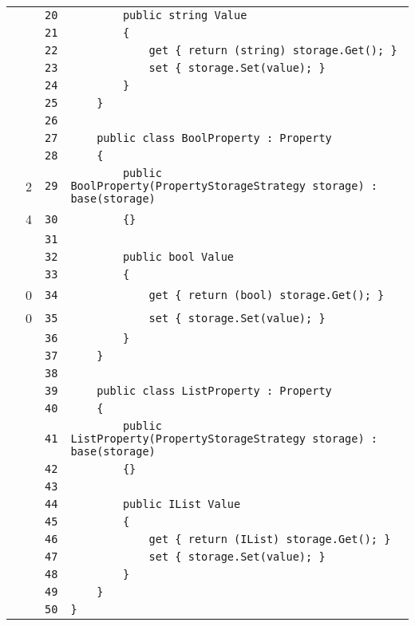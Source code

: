 \documentclass[a4paper,10pt]{article}
\begin{document}
\begin{longtable}[l]{lrrl}
\cellcolor{gray} &  & \verb~20~ & \verb~        public string Value~\\
\cellcolor{gray} &  & \verb~21~ & \verb~        {~\\
\cellcolor{gray} &  & \verb~22~ & \verb~            get { return (string) storage.Get(); }~\\
\cellcolor{gray} &  & \verb~23~ & \verb~            set { storage.Set(value); }~\\
\cellcolor{gray} &  & \verb~24~ & \verb~        }~\\
\cellcolor{gray} &  & \verb~25~ & \verb~    }~\\
\cellcolor{gray} &  & \verb~26~ & \verb~~\\
\cellcolor{gray} &  & \verb~27~ & \verb~    public class BoolProperty : Property~\\
\cellcolor{gray} &  & \verb~28~ & \verb~    {~\\
\cellcolor{green} & 2 & \verb~29~ & \verb~        public BoolProperty(PropertyStorageStrategy storage) : base(storage)~\\
\cellcolor{green} & 4 & \verb~30~ & \verb~        {}~\\
\cellcolor{gray} &  & \verb~31~ & \verb~~\\
\cellcolor{gray} &  & \verb~32~ & \verb~        public bool Value~\\
\cellcolor{gray} &  & \verb~33~ & \verb~        {~\\
\cellcolor{red} & 0 & \verb~34~ & \verb~            get { return (bool) storage.Get(); }~\\
\cellcolor{red} & 0 & \verb~35~ & \verb~            set { storage.Set(value); }~\\
\cellcolor{gray} &  & \verb~36~ & \verb~        }~\\
\cellcolor{gray} &  & \verb~37~ & \verb~    }~\\
\cellcolor{gray} &  & \verb~38~ & \verb~~\\
\cellcolor{gray} &  & \verb~39~ & \verb~    public class ListProperty : Property~\\
\cellcolor{gray} &  & \verb~40~ & \verb~    {~\\
\cellcolor{gray} &  & \verb~41~ & \verb~        public ListProperty(PropertyStorageStrategy storage) : base(storage)~\\
\cellcolor{gray} &  & \verb~42~ & \verb~        {}~\\
\cellcolor{gray} &  & \verb~43~ & \verb~~\\
\cellcolor{gray} &  & \verb~44~ & \verb~        public IList Value~\\
\cellcolor{gray} &  & \verb~45~ & \verb~        {~\\
\cellcolor{gray} &  & \verb~46~ & \verb~            get { return (IList) storage.Get(); }~\\
\cellcolor{gray} &  & \verb~47~ & \verb~            set { storage.Set(value); }~\\
\cellcolor{gray} &  & \verb~48~ & \verb~        }~\\
\cellcolor{gray} &  & \verb~49~ & \verb~    }~\\
\cellcolor{gray} &  & \verb~50~ & \verb~}~\\
\end{longtable}
\newpage
\end{document}
